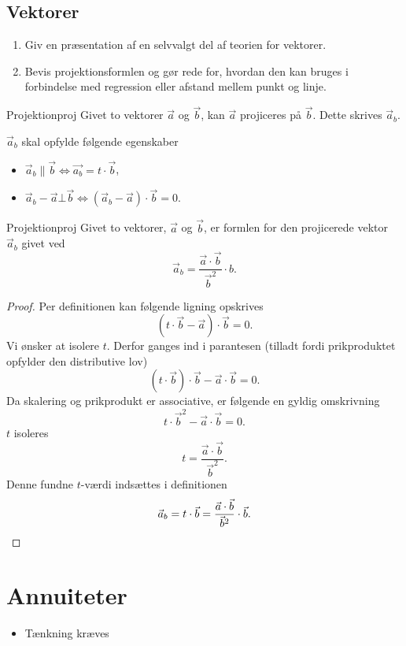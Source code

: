 \documentclass{article}
\begin{document}
\begin{tcolorbox}
	\section{Vektorer}
	\tcblower
	\begin{enumerate}
		\item Giv en præsentation af en selvvalgt del af teorien for vektorer.
		\item Bevis projektionsformlen og gør rede for, hvordan den kan bruges
			i forbindelse med regression eller afstand mellem punkt og linje.
	\end{enumerate}
\end{tcolorbox}

\begin{definition}{Projektion}{proj}
	Givet to vektorer $\vec{a}$ og $\vec{b}$, kan $\vec{a}$ projiceres på
	$\vec{b}$. Dette skrives $\vec{a}_b$.

	$\vec{a}_b$ skal opfylde følgende egenskaber
	\begin{itemize}
		\item $\vec{a}_b \parallel \vec{b} \iff \vec{a_b} = t \cdot \vec{b}$,
		\item $\vec{a}_b - \vec{a} \bot \vec{b} \iff (\vec{a}_b - \vec{a}) \cdot \vec{b} = 0$.
	\end{itemize}
\end{definition}

\begin{theorem}{Projektion}{proj}
	Givet to vektorer, $\vec{a}$ og $\vec{b}$, er formlen for den projicerede
	vektor $\vec{a}_b$ givet ved 
	\[
		\vec{a}_b = \frac{\vec{a} \cdot \vec{b}}{\vec{b}^2} \cdot b.
	\] 
\end{theorem}

\begin{proof}
Per definitionen kan følgende ligning opskrives
\[
	(t \cdot \vec{b} - \vec{a}) \cdot \vec{b} = 0.
\] 
Vi ønsker at isolere $t$. Derfor ganges ind i parantesen (tilladt fordi
prikproduktet opfylder den distributive lov)
\[
	(t \cdot \vec{b}) \cdot \vec{b} - \vec{a} \cdot \vec{b} = 0.
\] 
Da skalering og prikprodukt er associative, er følgende en gyldig omskrivning
\[
	t \cdot \vec{b}^2 - \vec{a} \cdot \vec{b} = 0.
\] 
$t$ isoleres
\[
	t = \frac{\vec{a} \cdot \vec{b}}{\vec{b}^2}.
\] 
Denne fundne $t$-værdi indsættes i definitionen
\[
	\vec{a}_b = t \cdot \vec{b} = \frac{\vec{a} \cdot \vec{b}}{\vec{b}^2} \cdot \vec{b}.\qedhere
\] 
\end{proof}

\section{Annuiteter}
\begin{itemize}
	\item Tænkning kræves
\end{itemize}

\printindex
\end{document}
